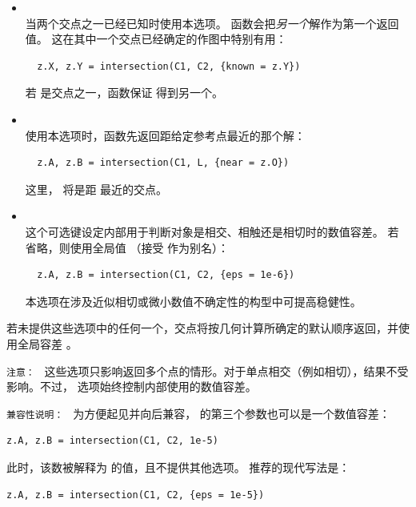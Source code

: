 \begin{itemize}
  \item {}  \\
  当两个交点之一已经已知时使用本选项。
  函数会把\emph{另一个}解作为第一个返回值。
  这在其中一个交点已经确定的作图中特别有用：

  \begin{mybox}
  \begin{verbatim}
  z.X, z.Y = intersection(C1, C2, {known = z.Y})
  \end{verbatim}
  \end{mybox}

  若  是交点之一，函数保证  得到另一个。

  \item {}  \\
  使用本选项时，函数先返回距给定参考点最近的那个解：

  \begin{mybox}
  \begin{verbatim}
  z.A, z.B = intersection(C1, L, {near = z.O})
  \end{verbatim}
  \end{mybox}

  这里， 将是距  最近的交点。

  \item {}  \\
  这个可选键设定内部用于判断对象是相交、相触还是相切时的数值容差。
  若省略，则使用全局值 
  （接受  作为别名）：

  \begin{mybox}
  \begin{verbatim}
  z.A, z.B = intersection(C1, C2, {eps = 1e-6})
  \end{verbatim}
  \end{mybox}

  本选项在涉及近似相切或微小数值不确定性的构型中可提高稳健性。

\end{itemize}

若未提供这些选项中的任何一个，交点将按几何计算所确定的默认顺序返回，并使用全局容差 。

\medskip

\texttt{注意： } 这些选项只影响返回多个点的情形。对于单点相交（例如相切），结果不受影响。不过， 选项始终控制内部使用的数值容差。

\medskip
\texttt{兼容性说明： }
为方便起见并向后兼容， 的第三个参数也可以是一个数值容差：
\begin{mybox}
\begin{verbatim}
z.A, z.B = intersection(C1, C2, 1e-5)
\end{verbatim}
\end{mybox}
此时，该数被解释为  的值，且不提供其他选项。
推荐的现代写法是：
\begin{mybox}
\begin{verbatim}
z.A, z.B = intersection(C1, C2, {eps = 1e-5})
\end{verbatim}
\end{mybox}




